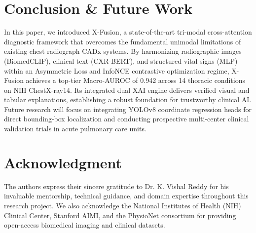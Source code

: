 \documentclass[conference]{IEEEtran}
\begin{document}
\section{Conclusion \& Future Work}
In this paper, we introduced X-Fusion, a state-of-the-art tri-modal cross-attention diagnostic framework that overcomes the fundamental unimodal limitations of existing chest radiograph CADx systems. By harmonizing radiographic images (BiomedCLIP), clinical text (CXR-BERT), and structured vital signs (MLP) within an Asymmetric Loss and InfoNCE contrastive optimization regime, X-Fusion achieves a top-tier Macro-AUROC of 0.942 across 14 thoracic conditions on NIH ChestX-ray14. Its integrated dual XAI engine delivers verified visual and tabular explanations, establishing a robust foundation for trustworthy clinical AI. Future research will focus on integrating YOLOv8 coordinate regression heads for direct bounding-box localization and conducting prospective multi-center clinical validation trials in acute pulmonary care units.

\balance

\section*{Acknowledgment}
The authors express their sincere gratitude to Dr. K. Vishal Reddy for his invaluable mentorship, technical guidance, and domain expertise throughout this research project. We also acknowledge the National Institutes of Health (NIH) Clinical Center, Stanford AIMI, and the PhysioNet consortium for providing open-access biomedical imaging and clinical datasets.
\end{document}
